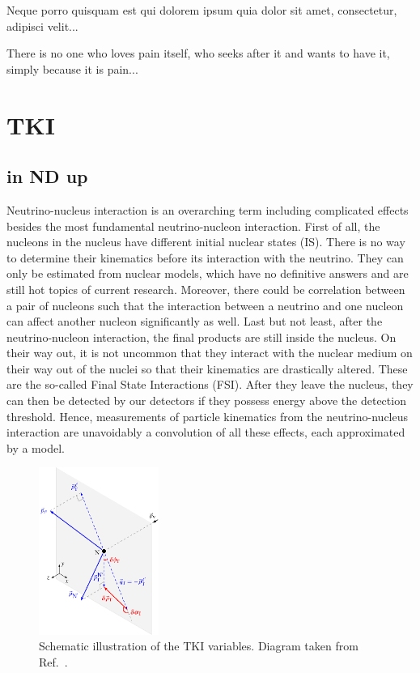 \begin{savequote}[8cm]
\textlatin{Neque porro quisquam est qui dolorem ipsum quia dolor sit amet, consectetur, adipisci velit...}

There is no one who loves pain itself, who seeks after it and wants to have it, simply because it is pain...
\end{savequote}

\chapter{\label{ch:5-tki}TKI} 

\minitoc

\section{in ND up}


       Neutrino-nucleus interaction is an overarching term including complicated effects besides the most fundamental neutrino-nucleon interaction. 
       First of all, the nucleons in the nucleus have different initial nuclear states (IS). 
       There is no way to determine their kinematics before its interaction with the neutrino. 
       They can only be estimated from nuclear models, which have no definitive answers and are still hot topics of current research. 
       Moreover, there could be correlation between a pair of nucleons such that the interaction between a neutrino and one nucleon can affect another nucleon significantly as well. Last but not least, after the neutrino-nucleon interaction, the final products are still inside the nucleus. 
       On their way out, it is not uncommon that they interact with the nuclear medium on their way out of the nuclei so that their kinematics are drastically altered. 
       These are the so-called Final State Interactions (FSI). 
       After they leave the nucleus, they can then be detected by our detectors if they possess energy above the detection threshold. 
       Hence, measurements of particle kinematics from the neutrino-nucleus interaction are unavoidably a convolution of all these effects, each approximated by a model. 
    
        \begin{figure}[!htb] 	
            \centering 		
            \includegraphics[width=0.35\textwidth]{figures/stki.eps}
            \caption{\label{fig:stki} Schematic illustration of the TKI variables. Diagram taken from Ref.~\cite{Lu:2015tcr}.} 
        \end{figure}
    

